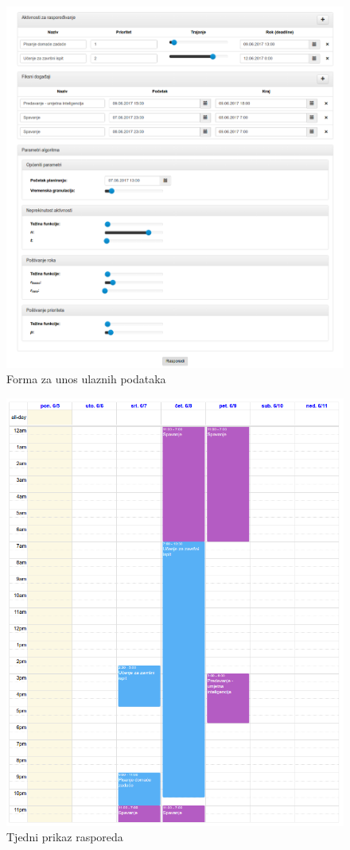 \documentclass[times, utf8, zavrsni]{fer}
\begin{document}
\begin{figure}[]
\centering
\includegraphics[width=\textwidth]{graphics/screenshot-form.png}
\caption{Forma za unos ulaznih podataka}
\label{img:forma}
\end{figure}

\begin{figure}[]
\centering
\includegraphics[width=\textwidth]{graphics/screenshot-raspored-1.png}
\caption{Tjedni prikaz rasporeda}
\label{img:weekly_calendar}
\end{figure}
\end{document}
